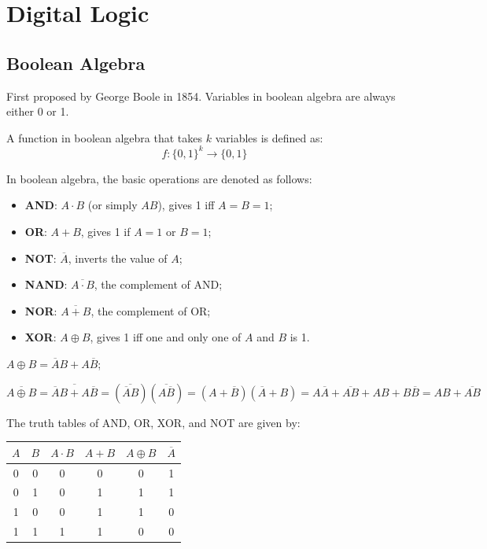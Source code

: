 \section{Digital Logic}

\subsection{Boolean Algebra}
First proposed by George Boole in 1854.
Variables in boolean algebra are always either 0 or 1.

\begin{definition}\label{def:boolean-function}
    A function in boolean algebra that takes $k$ variables is defined as:
    \begin{equation*}
        f: \{0,1\}^k \rightarrow \{0,1\}
    \end{equation*}
\end{definition}

\begin{definition}
    In boolean algebra, the basic operations are denoted as follows:
    \begin{itemize}
        \item \textbf{AND}: $A\cdot B$ (or simply $AB$), gives 1 iff $A=B=1$;
        \item \textbf{OR}:  $A+B$, gives 1 if $A=1$ or $B=1$;
        \item \textbf{NOT}: $\overline{A}$, inverts the value of $A$;
        \item \textbf{NAND}: $\overline{A\cdot B}$, the complement of AND;
        \item \textbf{NOR}: $\overline{A+B}$, the complement of OR;
        \item \textbf{XOR}: $A\oplus B$, gives 1 iff one and only one of $A$ and $B$ is 1.
    \end{itemize}
\end{definition}

\begin{remark}
    $A\oplus B = \overline{A}B + A\overline{B}$;

    $\overline{A\oplus B} = \overline{\overline{A}B + A\overline{B}}
    = (\overline{\overline{A}B})(\overline{A\overline{B}}) = (A+\overline{B})(\overline{A}+B)
    = A\overline{A}+\overline{AB}+AB+B\overline{B} = AB+\overline{AB}$
\end{remark}

The truth tables of AND, OR, XOR, and NOT are given by:
\begin{table}[h]
\centering
\begin{tabular}{|c|c||c|c|c|c|}
    \hline
    $A$ & $B$ & $A\cdot B$ & $A+B$ & $A\oplus B$ & $\overline{A}$\\
    \hline
    0 & 0 & 0 & 0 & 0 & 1 \\
    0 & 1 & 0 & 1 & 1 & 1 \\
    1 & 0 & 0 & 1 & 1 & 0 \\
    1 & 1 & 1 & 1 & 0 & 0 \\
    \hline
\end{tabular}
\end{table}

